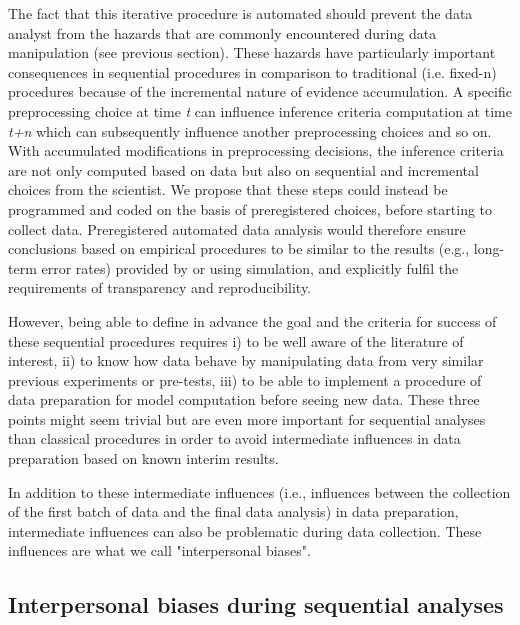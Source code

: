 \documentclass[a4paper,jou,natbib,floatsintext,donotrepeattitle]{apa6}
\begin{document}
The fact that this iterative procedure is automated should prevent the data analyst from the hazards that are commonly encountered during data manipulation (see previous section). These hazards have particularly important consequences in sequential procedures in comparison to traditional (i.e. fixed-n) procedures because of the incremental nature of evidence accumulation. A specific preprocessing choice at time \textit{t} can influence inference criteria computation at time \textit{t+n} which can subsequently influence another preprocessing choices and so on. With accumulated modifications in preprocessing decisions, the inference criteria are not only computed based on data but also on sequential and incremental choices from the scientist. We propose that these steps could instead be programmed and coded on the basis of preregistered choices, before starting to collect data. Preregistered automated data analysis would therefore ensure conclusions based on empirical procedures to be similar to the results (e.g., long-term error rates) provided by \cite{schonbrodt_sequential_2017} or \cite{kruschke_doing_2015} using simulation, and explicitly fulfil the requirements of transparency and reproducibility. \par

However, being able to define in advance the goal and the criteria for success of these sequential procedures requires i) to be well aware of the literature of interest, ii) to know how data behave by manipulating data from very similar previous experiments or pre-tests, iii) to be able to implement a procedure of data preparation for model computation before seeing new data. These three points might seem trivial but are even more important for sequential analyses than classical procedures in order to avoid intermediate influences in data preparation based on known interim results. \par

In addition to these intermediate influences (i.e., influences between the collection of the first batch of data and the final data analysis) in data preparation, intermediate influences can also be problematic during data collection. These influences are what we call "interpersonal biases".

\subsection{Interpersonal biases during sequential analyses}%
\end{document}
